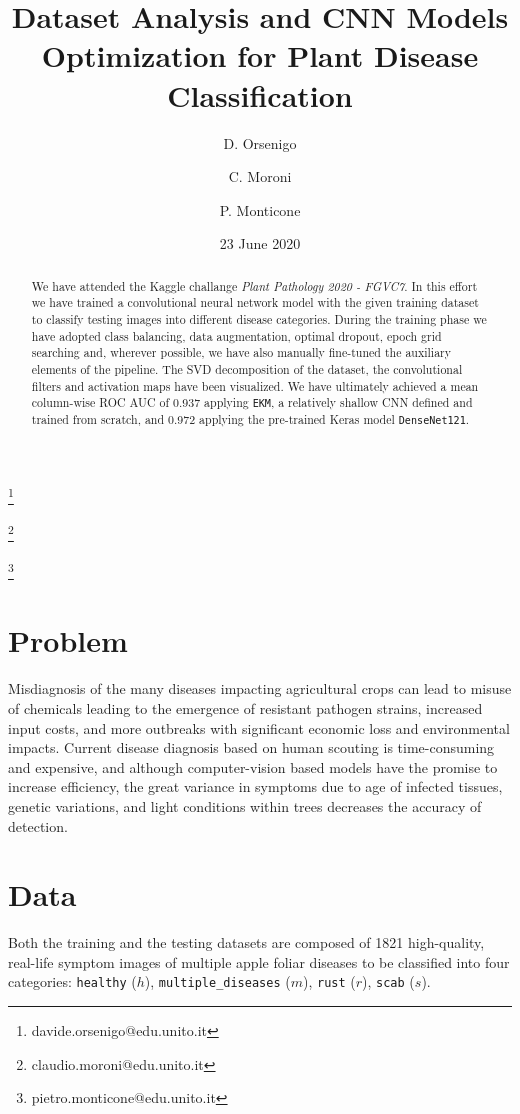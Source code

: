\documentclass[aps,twocolumn,secnumarabic,nobalancelastpage,amsmath,amssymb,
nofootinbib]{revtex4}
\begin{document}
\title{Dataset Analysis and CNN Models Optimization for Plant Disease
	Classification}
\author {D. Orsenigo}
\thanks{davide.orsenigo@edu.unito.it}
\author {C. Moroni}
\thanks{claudio.moroni@edu.unito.it}
\author {P. Monticone}
\thanks{pietro.monticone@edu.unito.it}

\date{23 June 2020}
\begin{abstract}
	We have attended the Kaggle challange \emph{Plant Pathology 2020 -
		FGVC7}. In this effort we have trained a convolutional neural network
	model with the given training dataset to classify testing images into
	different disease categories. During the training phase we have adopted
	class balancing, data augmentation, optimal dropout, epoch grid
	searching and, wherever possible, we have also manually fine-tuned the
	auxiliary elements of the pipeline. The SVD decomposition of the
	dataset, the convolutional filters and activation maps have been
	visualized. We have ultimately achieved a mean column-wise ROC AUC of
	0.937 applying \texttt{EKM}, a relatively shallow CNN defined and
	trained from scratch, and 0.972 applying the pre-trained Keras model
	\texttt{DenseNet121}.
\end{abstract}
\maketitle
\tableofcontents

\section{Problem}
Misdiagnosis of the many diseases impacting agricultural crops can lead to misuse of chemicals leading to the emergence of resistant pathogen strains, increased input costs, and more outbreaks with significant economic loss and environmental impacts. Current disease diagnosis based on human scouting is time-consuming and expensive, and although computer-vision based models have the promise to increase efficiency, the great variance in symptoms due to age of infected tissues, genetic variations, and light conditions within trees decreases the accuracy of detection.

\section{Data}
Both the training and the testing datasets are composed of 1821
high-quality, real-life symptom images of multiple apple foliar diseases
to be classified into four categories: \texttt{healthy} (\(h\)),
\texttt{multiple\_diseases} (\(m\)), \texttt{rust} (\(r\)),
\texttt{scab} (\(s\)). 
\end{document}
